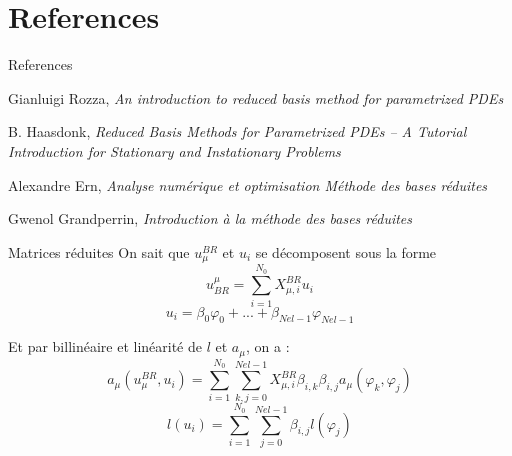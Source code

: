 \documentclass[10pt]{beamer}
\begin{document}
\begin{comment}
LE solveur EF est pas cher en 1D , un peu cher en 2D et tres cher en 3D.
\end{comment}



\section{References}
\begin{frame}[allowframebreaks]{References}

\begin{thebibliography}{9}

Gianluigi Rozza,  \emph{An introduction to reduced basis method for parametrized PDEs
 }

B. Haasdonk,  \emph{Reduced Basis Methods for Parametrized PDEs –
A Tutorial Introduction for Stationary and
Instationary Problems }


Alexandre Ern,  \emph{ Analyse numérique et optimisation
Méthode des bases réduites }

Gwenol Grandperrin,  \emph{Introduction à la méthode des bases réduites}

\end{thebibliography}
\end{frame}











\begin{frame}{Matrices réduites}
\noindent On sait que $u^{BR}_{\mu}$ et $u_i$  se décomposent sous la forme 
$$ 
u_{BR}^{\mu} = \sum_{i = 1}^{N_0} X^{BR}_{\mu, i}u_i 
$$
$$
u_i = \beta_0 \varphi_0 + ... + \beta_{Nel-1} \varphi_{Nel-1} 
$$

Et par billinéaire et linéarité de $l$ et $a_{\mu}$, on a :
$$
a_{\mu}(u^{BR}_{\mu}, u_i) = \sum_{i= 1}^{N_0}
\sum_{k, j= 0}^{Nel-1} X^{BR}_{\mu, i} 
\beta_{i, k} \beta_{i, j} a_\mu(\varphi_{k}, \varphi_{j})
$$
$$
l(u_i) = \sum_{i= 1}^{N_0}\sum_{j= 0}^{Nel-1} \beta_{i, j} l(\varphi_{j})
$$

\end{frame}

\end{document}
